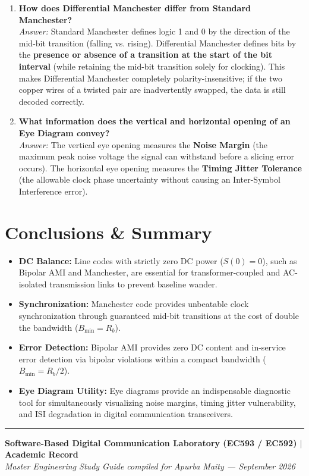 \documentclass[11pt,a4paper]{article}
\begin{document}
\begin{enumerate}
    \item \textbf{How does Differential Manchester differ from Standard Manchester?}\\
    \textit{Answer:} Standard Manchester defines logic 1 and 0 by the direction of the mid-bit transition (falling vs. rising). Differential Manchester defines bits by the \textbf{presence or absence of a transition at the start of the bit interval} (while retaining the mid-bit transition solely for clocking). This makes Differential Manchester completely polarity-insensitive; if the two copper wires of a twisted pair are inadvertently swapped, the data is still decoded correctly.

    \item \textbf{What information does the vertical and horizontal opening of an Eye Diagram convey?}\\
    \textit{Answer:} The vertical eye opening measures the \textbf{Noise Margin} (the maximum peak noise voltage the signal can withstand before a slicing error occurs). The horizontal eye opening measures the \textbf{Timing Jitter Tolerance} (the allowable clock phase uncertainty without causing an Inter-Symbol Interference error).
\end{enumerate}

\section{Conclusions \& Summary}
\begin{itemize}
    \item \textbf{DC Balance:} Line codes with strictly zero DC power ($S(0) = 0$), such as Bipolar AMI and Manchester, are essential for transformer-coupled and AC-isolated transmission links to prevent baseline wander.
    \item \textbf{Synchronization:} Manchester code provides unbeatable clock synchronization through guaranteed mid-bit transitions at the cost of double the bandwidth ($B_{\min} = R_b$).
    \item \textbf{Error Detection:} Bipolar AMI provides zero DC content and in-service error detection via bipolar violations within a compact bandwidth ($B_{\min} = R_b / 2$).
    \item \textbf{Eye Diagram Utility:} Eye diagrams provide an indispensable diagnostic tool for simultaneously visualizing noise margins, timing jitter vulnerability, and ISI degradation in digital communication transceivers.
\end{itemize}

\vspace{5mm}
\noindent\rule{\linewidth}{0.6pt}
\begin{center}
\small \textbf{Software-Based Digital Communication Laboratory (EC593 / EC592) \quad $\vert$ \quad Academic Record}\\
\textit{Master Engineering Study Guide compiled for Apurba Maity --- September 2026}
\end{center}
\end{document}
